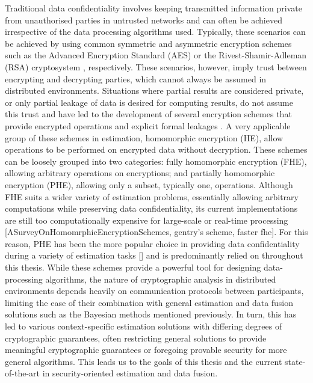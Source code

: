 Traditional data confidentiality involves keeping transmitted information private from unauthorised parties in untrusted networks and can often be achieved irrespective of the data processing algorithms used. Typically, these scenarios can be achieved by using common symmetric and asymmetric encryption schemes such as the Advanced Encryption Standard (AES) \cite{gueronIntelAdvancedEncryption2010} or the Rivest-Shamir-Adleman (RSA) cryptosystem \cite{rivestMethodObtainingDigital1978}, respectively. These scenarios, however, imply trust between encrypting and decrypting parties, which cannot always be assumed in distributed environments. Situations where partial results are considered private, or only partial leakage of data is desired for computing results, do not assume this trust and have led to the development of several encryption schemes that provide encrypted operations and explicit formal leakages \cite{paillierPublicKeyCryptosystemsBased1999,shiPrivacyPreservingAggregationTimeSeries2011,chotardDecentralizedMultiClientFunctional2018,andresGeoIndistinguishabilityDifferentialPrivacy2013}. A very applicable group of these schemes in estimation, homomorphic encryption (HE), allow operations to be performed on encrypted data without decryption. These schemes can be loosely grouped into two categories: fully homomorphic encryption (FHE), allowing arbitrary operations on encryptions; and partially homomorphic encryption (PHE), allowing only a subset, typically one, operations. Although FHE suits a wider variety of estimation problems, essentially allowing arbitrary computations while preserving data confidentiality, its current implementations are still too computationally expensive for large-scale or real-time processing [ASurveyOnHomomrphicEncryptionSchemes, gentry's scheme, faster fhe]. For this reason, PHE has been the more popular choice in providing data confidentiality during a variety of estimation tasks [] and is predominantly relied on throughout this thesis. While these schemes provide a powerful tool for designing data-processing algorithms, the nature of cryptographic analysis in distributed environments depends heavily on communication protocols between participants, limiting the ease of their combination with general estimation and data fusion solutions such as the Bayesian methods mentioned previously. In turn, this has led to various context-specific estimation solutions with differing degrees of cryptographic guarantees, often restricting general solutions to provide meaningful cryptographic guarantees or foregoing provable security for more general algorithms. This leads us to the goals of this thesis and the current state-of-the-art in security-oriented estimation and data fusion.

